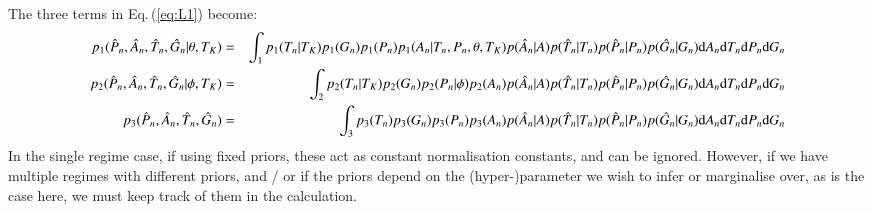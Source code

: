 \documentclass[11pt,a4paper]{article}
\begin{document}
The three terms in Eq.\,(\ref{eq:L1}) become:
\begin{eqnarray}
p_1(\hat{P}_n,\hat{A}_n,\hat{T}_n,\hat{G}_n|\theta,T_K) & = & \int_1 p_1(T_n|T_K) p_1(G_n) p_1(P_n) p_1(A_n|T_n,P_n,\theta,T_K)
p(\hat{A}_n|A) p(\hat{T}_n|T_n) p(\hat{P}_n|P_n) p(\hat{G}_n|G_n) {\rm d}A_n {\rm d}T_n {\rm d}P_n {\rm d}G_n
\label{eq:compo1} \\
p_2(\hat{P}_n,\hat{A}_n,\hat{T}_n,\hat{G}_n|\phi,T_K) & = & \int_2 p_2(T_n|T_K) p_2(G_n) p_2(P_n|\phi) p_2(A_n) 
p(\hat{A}_n|A) p(\hat{T}_n|T_n) p(\hat{P}_n|P_n) p(\hat{G}_n|G_n) {\rm d}A_n {\rm d}T_n {\rm d}P_n {\rm d}G_n
\label{eq:compo2} \\
p_3(\hat{P}_n,\hat{A}_n,\hat{T}_n,\hat{G}_n) & = & \int_3 p_3(T_n) p_3(G_n) p_3(P_n) p_3(A_n) 
p(\hat{A}_n|A) p(\hat{T}_n|T_n) p(\hat{P}_n|P_n) p(\hat{G}_n|G_n) {\rm d}A_n {\rm d}T_n {\rm d}P_n {\rm d}G_n
 \label{eq:compo3} 
\end{eqnarray}
In the single regime case, if using fixed priors, these act as
constant normalisation constants, and can be ignored. However, if we
have multiple regimes with different priors, and / or if the priors
depend on the (hyper-)parameter we wish to infer or marginalise over,
as is the case here, we must keep track of them in the calculation.
\end{document}
